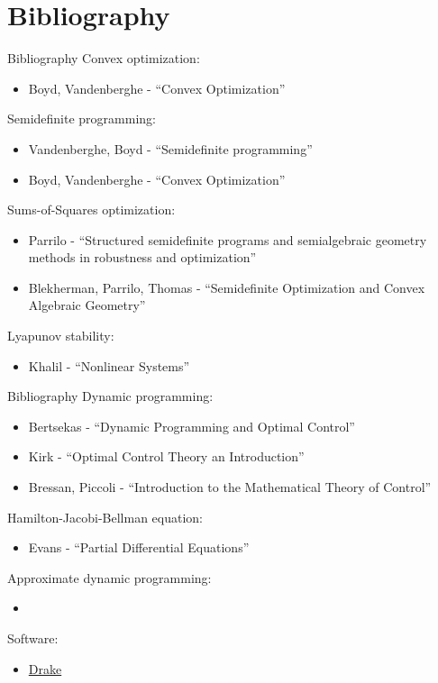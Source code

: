 \documentclass[aspectratio=169]{beamer}
\begin{document}
\section{Bibliography}
\begin{frame}{Bibliography}
\footnotesize
Convex optimization:
\begin{itemize}
\item
Boyd, Vandenberghe - ``Convex Optimization''
\end{itemize}
Semidefinite programming:
\begin{itemize}
\item
Vandenberghe, Boyd - ``Semidefinite programming''
\item
Boyd, Vandenberghe - ``Convex Optimization''
\end{itemize}
Sums-of-Squares optimization:
\begin{itemize}
\item
Parrilo - ``Structured semidefinite programs and semialgebraic geometry methods in robustness and optimization''
\item
Blekherman, Parrilo, Thomas - ``Semidefinite Optimization and Convex Algebraic Geometry''
\end{itemize}
Lyapunov stability:
\begin{itemize}
\item
Khalil - ``Nonlinear Systems''
\end{itemize}
\end{frame}

\begin{frame}{Bibliography}
\footnotesize
Dynamic programming:
\begin{itemize}
\item
Bertsekas - ``Dynamic Programming and Optimal Control''
\item
Kirk - ``Optimal Control Theory an Introduction''
\item
Bressan, Piccoli - ``Introduction to the Mathematical Theory of Control''
\end{itemize}
Hamilton-Jacobi-Bellman equation:
\begin{itemize}
\item
Evans - ``Partial Differential Equations''
\end{itemize}
Approximate dynamic programming:
\begin{itemize}
\item
\end{itemize}
Software:
\begin{itemize}
\item
\href{https://drake.mit.edu}{{\color{blue}Drake}}
\end{itemize}
\end{frame}
\end{document}
